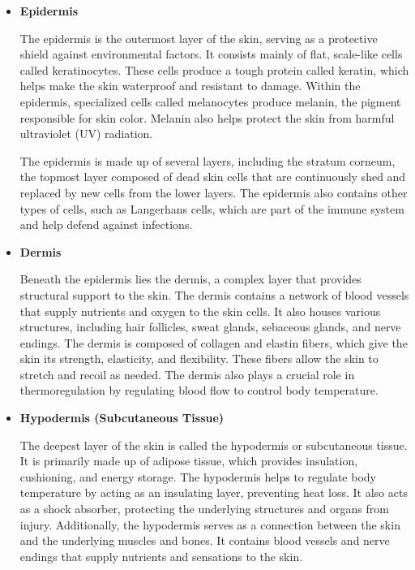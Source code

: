 \begin{itemize} \item \textbf{Epidermis}

      The epidermis is the outermost layer of the skin, serving as a protective
      shield against environmental factors. It consists mainly of flat,
      scale-like cells called keratinocytes. These cells produce a tough
      protein called keratin, which helps make the skin waterproof and
      resistant to damage. Within the epidermis, specialized cells called
      melanocytes produce melanin, the pigment responsible for skin color.
      Melanin also helps protect the skin from harmful ultraviolet (UV)
      radiation. \newline

      The epidermis is made up of several layers, including the stratum
      corneum, the topmost layer composed of dead skin cells that are
      continuously shed and replaced by new cells from the lower layers. The
      epidermis also contains other types of cells, such as Langerhans cells,
      which are part of the immune system and help defend against infections.

      \newpage

    \item \textbf{Dermis}

      Beneath the epidermis lies the dermis, a complex layer that provides
      structural support to the skin. The dermis contains a network of blood
      vessels that supply nutrients and oxygen to the skin cells. It also
      houses various structures, including hair follicles, sweat glands,
      sebaceous glands, and nerve endings. The dermis is composed of collagen
      and elastin fibers, which give the skin its strength, elasticity, and
      flexibility. These fibers allow the skin to stretch and recoil as needed.
      The dermis also plays a crucial role in thermoregulation by regulating
      blood flow to control body temperature.

    \item \textbf{Hypodermis (Subcutaneous Tissue)}

      The deepest layer of the skin is called the hypodermis or subcutaneous
      tissue. It is primarily made up of adipose tissue, which provides
      insulation, cushioning, and energy storage. The hypodermis helps to
      regulate body temperature by acting as an insulating layer, preventing
      heat loss. It also acts as a shock absorber, protecting the underlying
      structures and organs from injury. Additionally, the hypodermis serves as
      a connection between the skin and the underlying muscles and bones. It
      contains blood vessels and nerve endings that supply nutrients and
      sensations to the skin.

\end{itemize}

